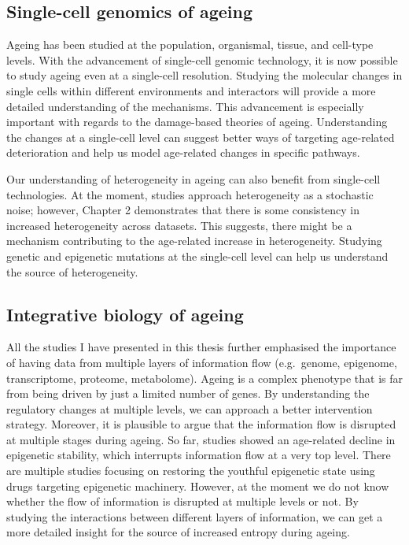 \documentclass[12pt,twoside]{unicam}
\begin{document}
\hypertarget{single-cell-genomics-of-ageing}{%
\subsection{Single-cell genomics of ageing}\label{single-cell-genomics-of-ageing}}

Ageing has been studied at the population, organismal, tissue, and cell-type levels. With the advancement of single-cell genomic technology, it is now possible to study ageing even at a single-cell resolution. Studying the molecular changes in single cells within different environments and interactors will provide a more detailed understanding of the mechanisms. This advancement is especially important with regards to the damage-based theories of ageing. Understanding the changes at a single-cell level can suggest better ways of targeting age-related deterioration and help us model age-related changes in specific pathways.

Our understanding of heterogeneity in ageing can also benefit from single-cell technologies. At the moment, studies approach heterogeneity as a stochastic noise; however, Chapter 2 demonstrates that there is some consistency in increased heterogeneity across datasets. This suggests, there might be a mechanism contributing to the age-related increase in heterogeneity. Studying genetic and epigenetic mutations at the single-cell level can help us understand the source of heterogeneity.

\hypertarget{integrative-biology-of-ageing}{%
\subsection{Integrative biology of ageing}\label{integrative-biology-of-ageing}}

All the studies I have presented in this thesis further emphasised the importance of having data from multiple layers of information flow (e.g.~genome, epigenome, transcriptome, proteome, metabolome). Ageing is a complex phenotype that is far from being driven by just a limited number of genes. By understanding the regulatory changes at multiple levels, we can approach a better intervention strategy. Moreover, it is plausible to argue that the information flow is disrupted at multiple stages during ageing. So far, studies showed an age-related decline in epigenetic stability, which interrupts information flow at a very top level. There are multiple studies focusing on restoring the youthful epigenetic state using drugs targeting epigenetic machinery. However, at the moment we do not know whether the flow of information is disrupted at multiple levels or not. By studying the interactions between different layers of information, we can get a more detailed insight for the source of increased entropy during ageing.
\end{document}
